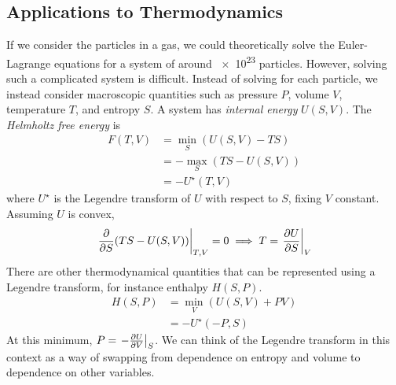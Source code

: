 \subsection{Applications to Thermodynamics}
If we consider the particles in a gas, we could theoretically solve the Euler-Lagrange equations for a system of around \num{e23} particles.
However, solving such a complicated system is difficult.
Instead of solving for each particle, we instead consider macroscopic quantities such as pressure \( P \), volume \( V \), temperature \( T \), and entropy \( S \).
A system has \textit{internal energy} \( U(S, V) \).
The \textit{Helmholtz free energy} is
\begin{align*}
	F(T, V) & = \min_S (U(S, V) - TS)   \\
	        & = - \max_S (TS - U(S, V)) \\
	        & = -U^\star(T, V)
\end{align*}
where \( U^\star \) is the Legendre transform of \( U \) with respect to \( S \), fixing \( V \) constant.
Assuming \( U \) is convex,
\[
	\eval{\pdv{S} \qty(TS - U(S,V))}_{T,V} = 0 \implies T = \eval{\pdv{U}{S}}_{V}
\]
There are other thermodynamical quantities that can be represented using a Legendre transform, for instance enthalpy \( H(S, P) \).
\begin{align*}
	H(S, P) & = \min_V (U(S,V) + PV) \\
	        & = - U^\star(-P, S)
\end{align*}
At this minimum, \( P = \eval{-\pdv{U}{V}}_S \).
We can think of the Legendre transform in this context as a way of swapping from dependence on entropy and volume to dependence on other variables.

